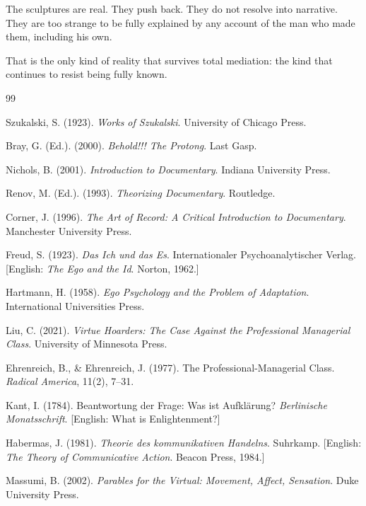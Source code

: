 \documentclass[11pt, a4paper]{article}
\theoremstyle{named}
\begin{document}
The sculptures are real. They push back. They do not resolve into
narrative. They are too strange to be fully explained by any account
of the man who made them, including his own.

That is the only kind of reality that survives total mediation:
the kind that continues to resist being fully known.

\begin{thebibliography}{99}

Szukalski, S. (1923).
\textit{Works of Szukalski}.
University of Chicago Press.

Bray, G. (Ed.). (2000).
\textit{Behold!!! The Protong}.
Last Gasp.

Nichols, B. (2001).
\textit{Introduction to Documentary}.
Indiana University Press.

Renov, M. (Ed.). (1993).
\textit{Theorizing Documentary}.
Routledge.

Corner, J. (1996).
\textit{The Art of Record: A Critical Introduction to Documentary}.
Manchester University Press.

Freud, S. (1923).
\textit{Das Ich und das Es}.
Internationaler Psychoanalytischer Verlag.
[English: \textit{The Ego and the Id}. Norton, 1962.]

Hartmann, H. (1958).
\textit{Ego Psychology and the Problem of Adaptation}.
International Universities Press.

Liu, C. (2021).
\textit{Virtue Hoarders: The Case Against the Professional Managerial Class}.
University of Minnesota Press.

Ehrenreich, B., \& Ehrenreich, J. (1977).
The Professional-Managerial Class.
\textit{Radical America}, 11(2), 7--31.

Kant, I. (1784).
Beantwortung der Frage: Was ist Aufkl\"{a}rung?
\textit{Berlinische Monatsschrift}.
[English: What is Enlightenment?]

Habermas, J. (1981).
\textit{Theorie des kommunikativen Handelns}.
Suhrkamp.
[English: \textit{The Theory of Communicative Action}. Beacon Press, 1984.]

Massumi, B. (2002).
\textit{Parables for the Virtual: Movement, Affect, Sensation}.
Duke University Press.


\end{thebibliography}
\end{document}
